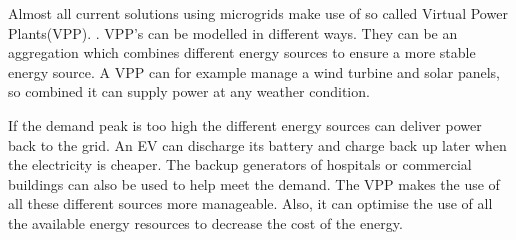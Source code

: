 Almost all current solutions using microgrids make use of so called Virtual Power Plants(VPP).\cite{vpprealenergy} . VPP's can be modelled in different ways. They can be an aggregation which combines different energy sources to ensure a more stable energy source\cite{vpprealenergy}. A VPP can for example manage a wind turbine and solar panels, so combined it can supply power at any weather condition. 	



If the demand peak is too high the different energy sources can deliver power back to the grid. An EV can discharge its battery and charge back up later when the electricity is cheaper. The backup generators of hospitals or commercial buildings can also be used to help meet the demand. The VPP makes the use of all these different sources more manageable. Also, it can optimise the use of all the available energy resources to decrease the cost of the energy.\cite{microgridsmarketenv}